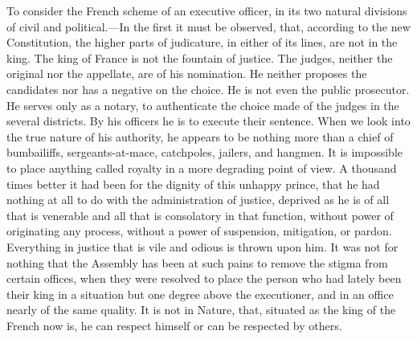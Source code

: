 To consider the French scheme of an executive officer, in its two natural divisions of civil and political.—In the first it must be observed, that, according to the new Constitution, the higher parts of judicature, in either of its lines, are not in the king. The king of France is not the fountain of justice. The judges, neither the original nor the appellate, are of his nomination. He neither proposes the candidates nor has a negative on the choice. He is not even the public prosecutor. He serves only as a notary, to authenticate the choice made of the judges in the several districts. By his officers he is to execute their sentence. When we look into the true nature of his authority, he appears to be nothing more than a chief of bumbailiffs, sergeants-at-mace, catchpoles, jailers, and hangmen. It is impossible to place anything called royalty in a more degrading point of view. A thousand times better it had been for the dignity of this unhappy prince, that he had nothing at all to do with the administration of justice, deprived as he is of all that is venerable and all that is consolatory in that function, without power of originating any process, without a power of suspension, mitigation, or pardon. Everything in justice that is vile and odious is thrown upon him. It was not for nothing that the Assembly has been at such pains to remove the stigma from certain offices, when they were resolved to place the person who had lately been their king in a situation but one degree above the executioner, and in an office nearly of the same quality. It is not in Nature, that, situated as the king of the French now is, he can respect himself or can be respected by others.

